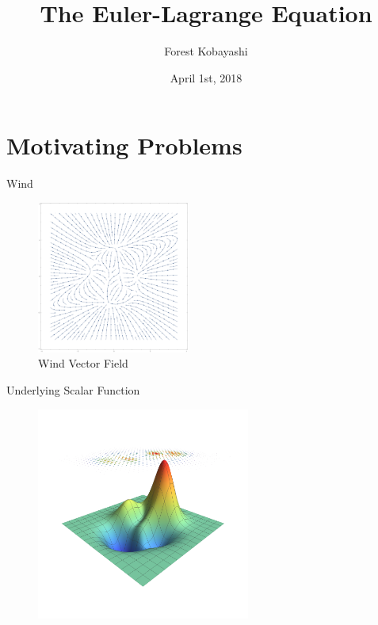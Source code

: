 \documentclass{fkpresentation}
\title{\textmd{The Euler-Lagrange Equation}}
\author{Forest Kobayashi}
\institute{Harvey Mudd College}
\date{April 1st, 2018}
\begin{document}
\frame{\titlepage}
\section{Motivating Problems}




\begin{frame}{Wind}
  \begin{figure}[h]
    \centering
    \includegraphics[keepaspectratio,height=5cm]{vector-field.pdf}
    \caption{Wind Vector Field}
    \label{fig:wind}
  \end{figure}
\end{frame}

\begin{frame}{Underlying Scalar Function}
  \begin{figure}[h]
    \centering
    \includegraphics[keepaspectratio,height=7cm]{vect-to-scalar.pdf}
  \end{figure}
\end{frame}
\end{document}
